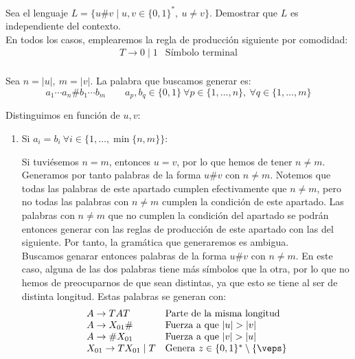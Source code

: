 \begin{ejercicio}\label{ej:1.4.18}
    Sea el lenguaje $L = \{ u\#v\mid u,v\in \{0,1\}^*,~u\neq v\}$. Demostrar que $L$ es independiente del contexto.\\

    En todos los casos, emplearemos la regla de producción siguiente por comodidad:
    \begin{equation*}
        \begin{array}{ll}
            T \to 0\mid 1 & \text{Símbolo terminal}\\
        \end{array}
    \end{equation*}

    Sea $n=|u|,~m=|v|$. La palabra que buscamos generar es:
    \begin{equation*}
        {a_1\cdots a_n}
        {\#}
        {b_1\cdots b_m}\qquad  a_p,b_q\in \{0,1\}~\forall p\in \{1,\ldots,n\},~\forall q\in \{1,\ldots,m\}
    \end{equation*}

    Distinguimos en función de $u,v$:
    \begin{enumerate}
        \item Si $a_i=b_i~\forall i\in \{1,\ldots,\min\{n,m\}\}$:
        
        Si tuviésemos $n=m$, entonces $u=v$, por lo que hemos de tener $n\neq m$. Generamos por tanto palabras de la forma $u\#v$ con $n\neq m$.
        Notemos que todas las palabras de este apartado cumplen efectivamente que $n\neq m$, pero no todas las palabras con $n\neq m$ cumplen la condición de este apartado. Las palabras con $n\neq m$ que no cumplen la condición del apartado se podrán entonces generar con las reglas de producción de este apartado con las del siguiente. Por tanto, la gramática que generaremos es ambigua.\\

        Buscamos genarar entonces palabras de la forma $u\#v$ con $n\neq m$.
        En este caso, alguna de las dos palabras tiene más símbolos que la otra, por lo que no hemos de preocuparnos de que sean distintas, ya que esto se tiene al ser de distinta longitud. Estas palabras se generan con:
        \begin{equation*}
            \begin{array}{ll}
                A\to TAT & \text{Parte de la misma longitud}\\
                A\to X_{01}\# & \text{Fuerza a que }|u|>|v|\\
                A\to \#X_{01} & \text{Fuerza a que }|v|>|u|\\
                X_{01} \to TX_{01}\mid T & \text{Genera }z\in \{0,1\}^*\setminus \{\veps\}
            \end{array}
        \end{equation*}


\end{enumerate}
\end{ejercicio}
